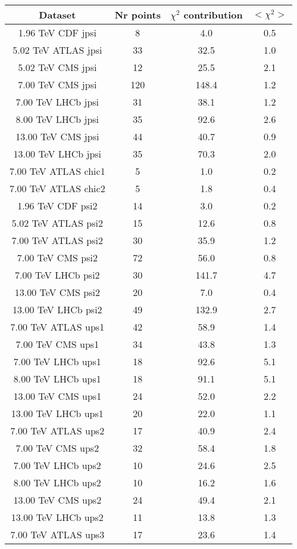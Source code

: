 \begin{table}[h!]
\centering
\begin{tabular}{c|c|c|c}
Dataset & Nr points & $\chi^2$ contribution & $<\chi^2>$ \\
\hline
1.96 TeV CDF jpsi & 8 & 4.0 & 0.5 \\
5.02 TeV ATLAS jpsi & 33 & 32.5 & 1.0 \\
5.02 TeV CMS jpsi & 12 & 25.5 & 2.1 \\
7.00 TeV CMS jpsi & 120 & 148.4 & 1.2 \\
7.00 TeV LHCb jpsi & 31 & 38.1 & 1.2 \\
8.00 TeV LHCb jpsi & 35 & 92.6 & 2.6 \\
13.00 TeV CMS jpsi & 44 & 40.7 & 0.9 \\
13.00 TeV LHCb jpsi & 35 & 70.3 & 2.0 \\
7.00 TeV ATLAS chic1 & 5 & 1.0 & 0.2 \\
7.00 TeV ATLAS chic2 & 5 & 1.8 & 0.4 \\
1.96 TeV CDF psi2 & 14 & 3.0 & 0.2 \\
5.02 TeV ATLAS psi2 & 15 & 12.6 & 0.8 \\
7.00 TeV ATLAS psi2 & 30 & 35.9 & 1.2 \\
7.00 TeV CMS psi2 & 72 & 56.0 & 0.8 \\
7.00 TeV LHCb psi2 & 30 & 141.7 & 4.7 \\
13.00 TeV CMS psi2 & 20 & 7.0 & 0.4 \\
13.00 TeV LHCb psi2 & 49 & 132.9 & 2.7 \\
7.00 TeV ATLAS ups1 & 42 & 58.9 & 1.4 \\
7.00 TeV CMS ups1 & 34 & 43.8 & 1.3 \\
7.00 TeV LHCb ups1 & 18 & 92.6 & 5.1 \\
8.00 TeV LHCb ups1 & 18 & 91.1 & 5.1 \\
13.00 TeV CMS ups1 & 24 & 52.0 & 2.2 \\
13.00 TeV LHCb ups1 & 20 & 22.0 & 1.1 \\
7.00 TeV ATLAS ups2 & 17 & 40.9 & 2.4 \\
7.00 TeV CMS ups2 & 32 & 58.4 & 1.8 \\
7.00 TeV LHCb ups2 & 10 & 24.6 & 2.5 \\
8.00 TeV LHCb ups2 & 10 & 16.2 & 1.6 \\
13.00 TeV CMS ups2 & 24 & 49.4 & 2.1 \\
13.00 TeV LHCb ups2 & 11 & 13.8 & 1.3 \\
7.00 TeV ATLAS ups3 & 17 & 23.6 & 1.4 \\

\end{tabular}
\end{table}
